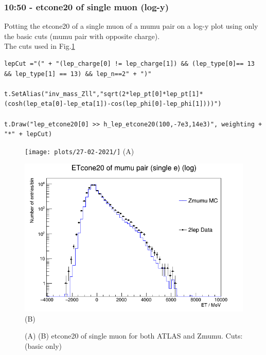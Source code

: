 \subsubsection*{10:50 - etcone20 of single muon (log-y)}
Potting the etcone20 of a single muon of a mumu pair on a log-y plot using only the basic cuts (mumu pair with opposite charge).
\\
The cuts used in Fig.\ref{fig:Stack-Zmumu-fast_single-etcone_(basic-cuts_2mumu-pair-opp-c)_27-02-21_10-50}
\begin{lstlisting}
lepCut ="(" + "(lep_charge[0] != lep_charge[1]) && (lep_type[0]== 13 && lep_type[1] == 13) && lep_n==2" + ")"    
    
t.SetAlias("inv_mass_Zll","sqrt(2*lep_pt[0]*lep_pt[1]*(cosh(lep_eta[0]-lep_eta[1])-cos(lep_phi[0]-lep_phi[1])))")

t.Draw("lep_etcone20[0] >> h_lep_etcone20(100,-7e3,14e3)", weighting + "*" + lepCut)
\end{lstlisting}

\begin{figure}[h!]
    \centering
    \begin{minipage}{0.5\textwidth}
        \centering
        \texttt{[image: plots/27-02-2021/]}
        (A)
    \end{minipage}\hfill
    \begin{minipage}{0.5\textwidth}
        \centering
        \includegraphics[width=\linewidth]{plots/27-02-2021/2-stack-Zmumu-fast_single-etcone_(basic-cuts_2mumu-pair-opp-c)_27-02-21_10-50.png}
        (B)
    \end{minipage}
    \caption{(A)  (B) etcone20 of single muon for both ATLAS and Zmumu.  Cuts: (basic only) }
    \label{fig:Stack-Zmumu-fast_single-etcone_(basic-cuts_2mumu-pair-opp-c)_27-02-21_10-50}
\end{figure}

